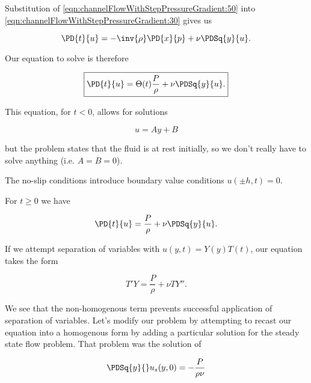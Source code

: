 Substitution of \ref{eqn:channelFlowWithStepPressureGradient:50} into \ref{eqn:channelFlowWithStepPressureGradient:30} gives us

\begin{equation}\label{eqn:channelFlowWithStepPressureGradient:70}
\PD{t}{u} = -\inv{\rho} \PD{x}{p} + \nu \PDSq{y}{u}.
\end{equation}

Our equation to solve is therefore

\begin{equation}\label{eqn:channelFlowWithStepPressureGradient:90}
\boxed{
\PD{t}{u} = \Theta(t) \frac{P}{\rho} + \nu \PDSq{y}{u}.
}
\end{equation}

This equation, for $t < 0$, allows for solutions

\begin{equation}\label{eqn:channelFlowWithStepPressureGradient:110}
u = A y + B
\end{equation}

but the problem states that the fluid is at rest initially, so we don't really have to solve anything (i.e. $A = B = 0$).

The no-slip conditions introduce boundary value conditions $u(\pm h, t) = 0$.

For $t \ge 0$ we have

\begin{equation}\label{eqn:channelFlowWithStepPressureGradient:130}
\PD{t}{u} = \frac{P}{\rho} + \nu \PDSq{y}{u}.
\end{equation}

If we attempt separation of variables with $u(y, t) = Y(y) T(t)$, our equation takes the form

\begin{equation}\label{eqn:channelFlowWithStepPressureGradient:150}
T' Y = \frac{P}{\rho} + \nu T Y''.
\end{equation}

We see that the non-homogenous term prevents successful application of separation of variables.  Let's modify our problem by attempting to recast our equation into a homogenous form by adding a particular solution for the steady state flow problem.  That problem was the solution of

\begin{equation}\label{eqn:channelFlowWithStepPressureGradient:170}
\PDSq{y}{} u_s(y, 0) = -\frac{P}{\rho \nu}
\end{equation}

